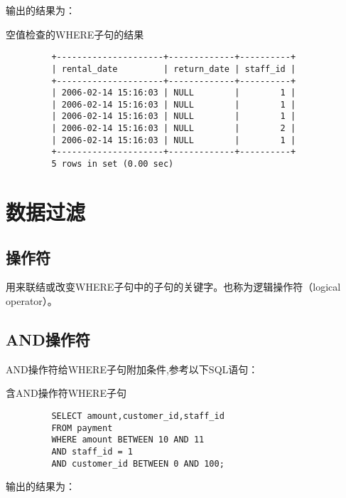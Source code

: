 \documentclass[UTF8]{article}
\begin{document}
输出的结果为：

\begin{listing}[H]
	\caption{空值检查的WHERE子句的结果}
	\label{code:isnullwhereclauseresult}
	\begin{verbatim}
         +---------------------+-------------+----------+
         | rental_date         | return_date | staff_id |
         +---------------------+-------------+----------+
         | 2006-02-14 15:16:03 | NULL        |        1 |
         | 2006-02-14 15:16:03 | NULL        |        1 |
         | 2006-02-14 15:16:03 | NULL        |        1 |
         | 2006-02-14 15:16:03 | NULL        |        2 |
         | 2006-02-14 15:16:03 | NULL        |        1 |
         +---------------------+-------------+----------+
         5 rows in set (0.00 sec)
        \end{verbatim}
\end{listing}

\section{数据过滤}

\subsection{操作符}
\begin{redbox}[frametitle={Defination 7.1 操作符（operator）}]
        用来联结或改变WHERE子句中的子句的关键字。也称为逻辑操作符（logical operator）。
\end{redbox}

\subsection{AND操作符}
AND操作符给WHERE子句附加条件,参考以下SQL语句：

\begin{listing}[H]
	\caption{含AND操作符WHERE子句}
	\label{code:andwhereclause}
	\begin{verbatim}
         SELECT amount,customer_id,staff_id 
         FROM payment 
         WHERE amount BETWEEN 10 AND 11 
         AND staff_id = 1 
         AND customer_id BETWEEN 0 AND 100;
        \end{verbatim}
\end{listing}

输出的结果为：
\end{document}
